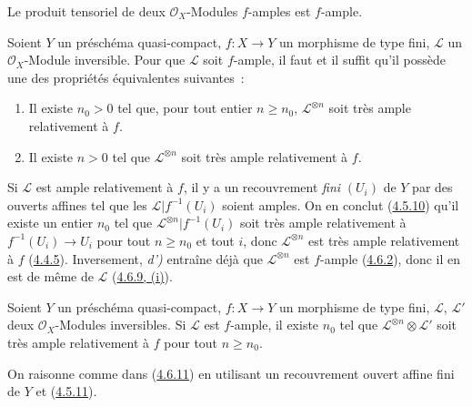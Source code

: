 \begin{corollary}[4.6.10]
\label{II.4.6.10-fr}
Le produit tensoriel de deux $\mathcal{O}_X$-Modules $f$-amples est
$f$-ample.
\end{corollary}

\begin{proposition}[4.6.11]
\label{II.4.6.11-fr}
Soient $Y$ un préschéma quasi-compact, $f:X\to Y$ un morphisme de type
fini, $\mathcal{L}$ un $\mathcal{O}_X$-Module inversible. Pour que
$\mathcal{L}$ soit $f$-ample, il faut et il suffit qu'il possède une des
propriétés équivalentes suivantes~:
\begin{enumerate}
  \item[\rm{d)}] Il existe $n_0>0$ tel que, pour tout entier $n\geq n_0$,
  $\mathcal{L}^{\otimes n}$ soit très ample relativement à $f$.
  \item[\rm{d')}] Il existe $n>0$ tel que $\mathcal{L}^{\otimes n}$ soit
  très ample relativement à $f$.
\end{enumerate}
\end{proposition}

Si $\mathcal{L}$ est ample relativement à $f$, il y a un recouvrement \emph{fini}
$(U_i)$ de $Y$ par des ouverts affines tel que les
$\mathcal{L}|f^{-1}(U_i)$ soient amples. On en conclut
(\hyperref[II.4.5.10-fr]{4.5.10}) qu'il existe un entier $n_0$ tel que
$\mathcal{L}^{\otimes n}|f^{-1}(U_i)$ soit très ample relativement à
$f^{-1}(U_i)\to U_i$ pour tout $n\geq n_0$ et tout $i$, donc
$\mathcal{L}^{\otimes n}$ est très ample relativement à $f$
(\hyperref[II.4.4.5-fr]{4.4.5}). Inversement, \emph{d')} entraîne déjà que
$\mathcal{L}^{\otimes n}$ est $f$-ample
(\hyperref[II.4.6.2-fr]{4.6.2}), donc il en est de même de $\mathcal{L}$
(\hyperref[II.4.6.9-fr]{4.6.9, (i)}).

\begin{corollary}[4.6.12]
\label{II.4.6.12-fr}
Soient $Y$ un préschéma quasi-compact, $f:X\to Y$ un morphisme de type
fini, $\mathcal{L}$, $\mathcal{L}'$ deux $\mathcal{O}_X$-Modules
inversibles. Si $\mathcal{L}$ est $f$-ample, il existe $n_0$ tel que
$\mathcal{L}^{\otimes n}\otimes\mathcal{L}'$ soit très ample relativement
à $f$ pour tout $n\geq n_0$.
\end{corollary}

On raisonne comme dans (\hyperref[II.4.6.11-fr]{4.6.11}) en utilisant un
recouvrement ouvert affine fini de $Y$ et
(\hyperref[II.4.5.11-fr]{4.5.11}).

